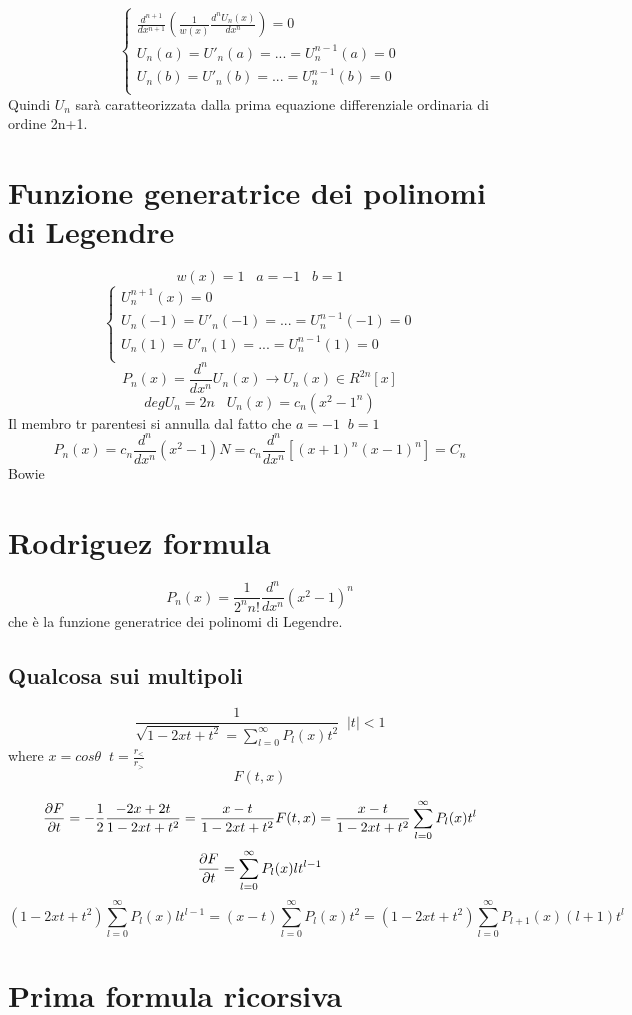$$\begin{cases}
   \frac{d^{n+1}}{dx^{n+1}}(\frac{1}{w(x)}\frac{d^nU_n(x)}{dx^n})=0 \\
   U_n(a)=U'_n(a)=...=U_n^{n-1}(a)=0 \\
   U_n(b)=U'_n(b)=...=U_n^{n-1}(b)=0 \\
\end{cases}$$
Quindi $U_n$ sarà caratteorizzata dalla prima equazione differenziale ordinaria di ordine 2n+1.

\section{Funzione generatrice dei polinomi di Legendre}
\[w(x)=1 \;\;\; a=-1 \;\;\; b=1\]
$$\begin{cases}
   U_n^{n+1}(x)=0 \\
   U_n(-1)=U'_n(-1)=...=U_n^{n-1}(-1)=0 \\
   U_n(1)=U'_n(1)=...=U_n^{n-1}(1)=0 \\
\end{cases}$$
\[P_n(x)=\frac{d^n}{dx^n}U_n(x) \rightarrow U_n(x) \in R^{2n}[x]\]
\[degU_n=2n \;\;\; U_n(x)=c_n(x^2-1^n)\]
Il membro tr parentesi si annulla dal fatto che $a=-1 \;\; b=1$
\[P_n(x)=c_n \frac{d^n}{dx^n}(x^2-1)N=c_n\frac{d^n}{dx^n} [(x+1)^n(x-1)^n]=C_n \] Bowie 

\section{Rodriguez formula}
\[P_n(x)=\frac{1}{2^n n!}\frac{d^n}{dx^n}(x^2-1)^n\]
che è la funzione generatrice dei polinomi di Legendre. 
\subsection{Qualcosa sui multipoli}
\[\frac{1}{\sqrt{1-2xt+t^2}=\sum_{l=0}^{\infty}P_l(x)t^2} \;\; |t|<1\]
where $x=cos\theta \;\; t=\frac{r_<}{r_>}$
$$F(t,x)$$

\[\pdv{F}{t}=- \frac{1}{2} \frac{-2x+2t}{1-2xt+t^2}=\frac{x-t}{1-2xt+t^2}F(t,x)=\frac{x-t}{1-2xt+t^2}\sum_{l=0}^{\infty}P_l(x)t^l\]
\[\pdv{F}{t}=\sum_{l=0}^{\infty}P_l(x)lt^{l-1}\]
\[(1-2xt+t^2)\sum_{l=0}^{\infty}P_l(x)lt^{l-1}=(x-t)\sum_{l=0}^{\infty}P_l(x)t^2=(1-2xt+t^2)\sum_{l=0}^{\infty}P_{l+1}(x)(l+1)t^l\]

\section{Prima formula ricorsiva}


